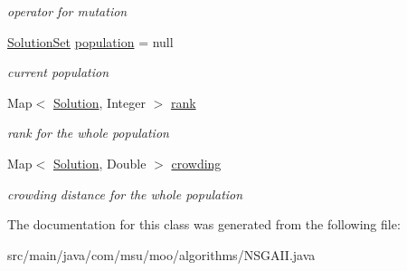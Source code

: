 \begin{DoxyCompactItemize}
\begin{DoxyCompactList}\small\item\em operator for mutation \end{DoxyCompactList}\item 
\hypertarget{classcom_1_1msu_1_1moo_1_1algorithms_1_1NSGAII_3_01V_01extends_01IVariable_00_01P_01extends_01IProblem_01_4_aa6f2611d1375c281a24bb08209eb6278}{\hyperlink{classcom_1_1msu_1_1moo_1_1model_1_1solution_1_1SolutionSet}{Solution\-Set} \hyperlink{classcom_1_1msu_1_1moo_1_1algorithms_1_1NSGAII_3_01V_01extends_01IVariable_00_01P_01extends_01IProblem_01_4_aa6f2611d1375c281a24bb08209eb6278}{population} = null}\label{classcom_1_1msu_1_1moo_1_1algorithms_1_1NSGAII_3_01V_01extends_01IVariable_00_01P_01extends_01IProblem_01_4_aa6f2611d1375c281a24bb08209eb6278}

\begin{DoxyCompactList}\small\item\em current population \end{DoxyCompactList}\item 
\hypertarget{classcom_1_1msu_1_1moo_1_1algorithms_1_1NSGAII_3_01V_01extends_01IVariable_00_01P_01extends_01IProblem_01_4_a295cd89e2476d609147aeecc77118d34}{Map$<$ \hyperlink{classcom_1_1msu_1_1moo_1_1model_1_1solution_1_1Solution}{Solution}, Integer $>$ \hyperlink{classcom_1_1msu_1_1moo_1_1algorithms_1_1NSGAII_3_01V_01extends_01IVariable_00_01P_01extends_01IProblem_01_4_a295cd89e2476d609147aeecc77118d34}{rank}}\label{classcom_1_1msu_1_1moo_1_1algorithms_1_1NSGAII_3_01V_01extends_01IVariable_00_01P_01extends_01IProblem_01_4_a295cd89e2476d609147aeecc77118d34}

\begin{DoxyCompactList}\small\item\em rank for the whole population \end{DoxyCompactList}\item 
\hypertarget{classcom_1_1msu_1_1moo_1_1algorithms_1_1NSGAII_3_01V_01extends_01IVariable_00_01P_01extends_01IProblem_01_4_a79a5b6f90573b528c174f1d91828a2ff}{Map$<$ \hyperlink{classcom_1_1msu_1_1moo_1_1model_1_1solution_1_1Solution}{Solution}, Double $>$ \hyperlink{classcom_1_1msu_1_1moo_1_1algorithms_1_1NSGAII_3_01V_01extends_01IVariable_00_01P_01extends_01IProblem_01_4_a79a5b6f90573b528c174f1d91828a2ff}{crowding}}\label{classcom_1_1msu_1_1moo_1_1algorithms_1_1NSGAII_3_01V_01extends_01IVariable_00_01P_01extends_01IProblem_01_4_a79a5b6f90573b528c174f1d91828a2ff}

\begin{DoxyCompactList}\small\item\em crowding distance for the whole population \end{DoxyCompactList}\end{DoxyCompactItemize}


The documentation for this class was generated from the following file\-:\begin{DoxyCompactItemize}
\item 
src/main/java/com/msu/moo/algorithms/N\-S\-G\-A\-I\-I.\-java\end{DoxyCompactItemize}
